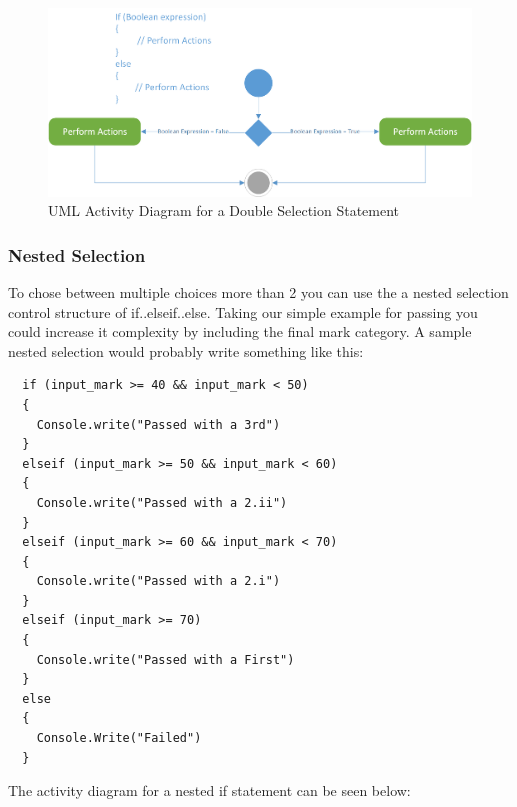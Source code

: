 \documentclass[
]{book}
\begin{document}
\begin{figure}

{\centering \includegraphics[width=1\linewidth]{images/if_else} 

}

\caption{UML Activity Diagram for a Double Selection Statement}\label{fig:unnamed-chunk-8}
\end{figure}

\hypertarget{nested-selection}{%
\subsubsection{Nested Selection}\label{nested-selection}}

To chose between multiple choices more than 2 you can use the a nested selection control structure of if..elseif..else.
Taking our simple example for passing you could increase it complexity by including the final mark category. A sample nested selection would probably write something like this:

\begin{verbatim}
  if (input_mark >= 40 && input_mark < 50)
  {
    Console.write("Passed with a 3rd")
  }
  elseif (input_mark >= 50 && input_mark < 60)
  {
    Console.write("Passed with a 2.ii")
  }
  elseif (input_mark >= 60 && input_mark < 70)
  {
    Console.write("Passed with a 2.i")
  }
  elseif (input_mark >= 70)
  {
    Console.write("Passed with a First")
  }
  else
  {
    Console.Write("Failed")
  }
\end{verbatim}

The activity diagram for a nested if statement can be seen below:
\end{document}
